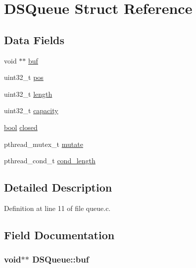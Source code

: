 \hypertarget{structDSQueue}{}\section{D\+S\+Queue Struct Reference}
\label{structDSQueue}
\subsection*{Data Fields}
\begin{DoxyCompactItemize}
\item 
void $\ast$$\ast$ \hyperlink{structDSQueue_ada89a56624af8c1a24f2abe6004cacde}{buf}
\item 
uint32\+\_\+t \hyperlink{structDSQueue_a77b07c69cbf472b979f491f5757e4a58}{pos}
\item 
uint32\+\_\+t \hyperlink{structDSQueue_abe11e160f25a9a87b7b7f78111c8c9f4}{length}
\item 
uint32\+\_\+t \hyperlink{structDSQueue_ab52ffad4efeddd0e4ce1bc11e0d24fa9}{capacity}
\item 
\hyperlink{whatDownBackEndApp_8c_a1062901a7428fdd9c7f180f5e01ea056}{bool} \hyperlink{structDSQueue_a6343bf4d2ad2ba6baa72f87cd21b7a1c}{closed}
\item 
pthread\+\_\+mutex\+\_\+t \hyperlink{structDSQueue_a3bdfb7e6aee291283183270e564e7a01}{mutate}
\item 
pthread\+\_\+cond\+\_\+t \hyperlink{structDSQueue_a086bc58081ff434dc5b0d46d98814599}{cond\+\_\+length}
\end{DoxyCompactItemize}


\subsection{Detailed Description}


Definition at line 11 of file queue.\+c.



\subsection{Field Documentation}
\subsubsection[{\texorpdfstring{buf}{buf}}]{\setlength{\rightskip}{0pt plus 5cm}void$\ast$$\ast$ D\+S\+Queue\+::buf}\hypertarget{structDSQueue_ada89a56624af8c1a24f2abe6004cacde}{}\label{structDSQueue_ada89a56624af8c1a24f2abe6004cacde}


